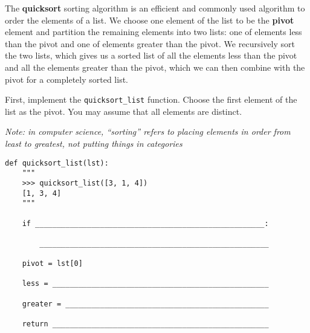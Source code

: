 \question The \textbf{quicksort} sorting algorithm is an efficient and commonly
used algorithm to order the elements of a list. We choose one element of the
list to be the \textbf{pivot} element and partition the remaining elements into
two lists: one of elements less than the pivot and one of elements greater than
the pivot. We recursively sort the two lists, which gives us a sorted list of
all the elements less than the pivot and all the elements greater than the
pivot, which we can then combine with the pivot for a completely sorted list.

First, implement the \texttt{quicksort\_list} function. Choose the first element
of the list as the pivot. You may assume that all elements are distinct.

\emph{Note: in computer science, ``sorting'' refers to placing elements in order from least to greatest, not putting things in categories}

\medskip

\begin{lstlisting}
def quicksort_list(lst):
    """
    >>> quicksort_list([3, 1, 4])
    [1, 3, 4]
    """

    if _____________________________________________________:

        _____________________________________________________

    pivot = lst[0]

    less = __________________________________________________

    greater = _______________________________________________

    return __________________________________________________
\end{lstlisting}

